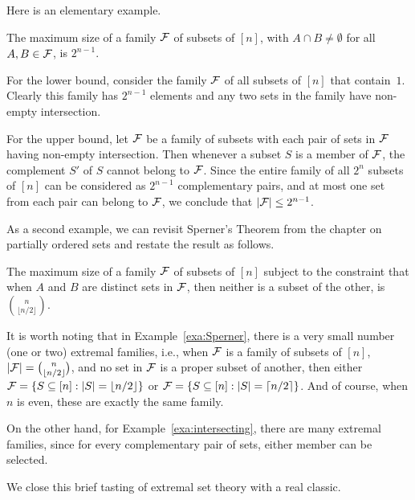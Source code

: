 Here is an elementary example.

\begin{example}\label{exa:intersecting}
The maximum size of a family $\mathcal{F}$ of subsets of $[n]$, with
$A\cap B\neq\emptyset$ for all $A,B\in\mathcal{F}$, is $2^{n-1}$.

For the lower bound, consider the family $\mathcal{F}$ of all subsets of
$[n]$ that contain~$1$.  Clearly this family has $2^{n-1}$ elements
and any two sets in the family have non-empty intersection.

For the upper bound, let $\mathcal{F}$ be a family of subsets with
each pair of sets in $\mathcal{F}$ having non-empty intersection.
Then whenever a subset $S$ is a member of $\mathcal{F}$,  the complement $S'$ of 
$S$ cannot belong to $\mathcal{F}$. Since the entire family of
all $2^n$ subsets of $[n]$ can be considered as $2^{n-1}$
complementary pairs, and at most one set from each pair
can belong to $\mathcal{F}$, we conclude that $|\mathcal{F}|\le 2^{n-1}$.
\end{example}

As a second example, we can revisit
Sperner's Theorem from the chapter on partially ordered sets and
restate the result as follows.

\begin{example}\label{exa:Sperner}  
The maximum size of a family $\mathcal{F}$ of
subsets of $[n]$ subject to the constraint that when $A$ and $B$
are distinct sets in $\mathcal{F}$, then neither is a subset of the other,
is $\binom{n}{\lfloor n/2\rfloor}$.
\end{example}

It is worth noting that in Example~\ref{exa:Sperner},
there is a very small number (one or two) extremal families, i.e.,
when $\mathcal{F}$ is a family of subsets of $[n]$, $|\mathcal{F}|=
\binom{n}{\lfloor n/2\rfloor}$, and no set in $\mathcal{F}$ is
a proper subset of another, then either $\mathcal{F}=\{S\subseteq[n]:
|S|=\lfloor n/2\rfloor\}$ or $\mathcal{F}=\{S\subseteq[n]:
|S|=\lceil n/2\rceil\}$.  And of course, when $n$ is even, these
are exactly the same family.

On the other hand, for Example~\ref{exa:intersecting}, there
are many extremal families, since for every complementary
pair of sets, either member can be selected.

We close this brief tasting of extremal set theory with a real
classic.

